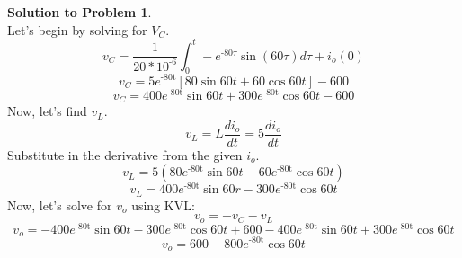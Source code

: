 \documentclass[11pt,letterpaper]{article}
\theoremstyle{definition}
\newtheorem{solprob}{\textcolor{solproblemcolor}{Solution to Problem}}  %
\begin{document}
\noindent\makebox[\linewidth]{\color{rouge_poly}{\rule{\textwidth}{1.3pt}}}

\begin{solprob} \text{}\\
    Let's begin by solving for $V_C$.
    \[v_C=\frac{1}{20*10^\text{-6}}\int^t_0-e^\text{-80$\tau$}\sin(60\tau)d\tau+i_o(0)\]
    \[v_C=5e^\text{-80t}[80\sin60t+60\cos60t]-600\]
    \[v_C=400e^\text{-80t}\sin60t+300e^\text{-80t}\cos60t-600\]
    Now, let's find $v_L$.
    \[v_L=L\frac{di_o}{dt}=5\frac{di_o}{dt}\]
    Substitute in the derivative from the given $i_o$.
    \[v_L=5(80e^\text{-80t}\sin60t-60e^\text{-80t}\cos60t)\]
    \[v_L=400e^\text{-80t}\sin60r-300e^\text{-80t}\cos60t\]
    Now, let's solve for $v_o$ using KVL:
    \[v_o=-v_C-v_L\]
    \[v_o=-400e^\text{-80t}\sin60t-300e^\text{-80t}\cos60t+600-400e^\text{-80t}\sin60t+300e^\text{-80t}\cos60t\]
    \[v_o=600-800e^\text{-80t}\cos60t\]
    
\end{solprob}
\end{document}
